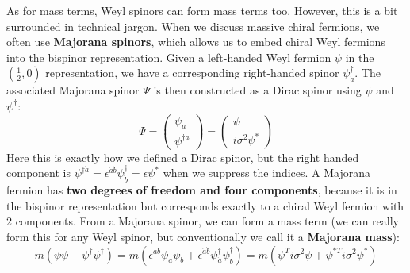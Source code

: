\documentclass[11pt, oneside]{article}   	%
\theoremstyle{definition}
\begin{document}
As for mass terms, Weyl spinors can form mass terms too. However, this is a bit surrounded in technical jargon. When we discuss massive 
chiral fermions, we often use \textbf{Majorana spinors}, which allows us to embed chiral Weyl fermions into the bispinor representation. 
Given a left-handed Weyl fermion $\psi$ in the $(\frac{1}{2}, 0)$ representation, we have a corresponding right-handed spinor 
$\psi^\dagger_{\dot a}$. The associated Majorana spinor $\Psi$ is then constructed as a Dirac spinor using $\psi$ and $\psi^\dagger$:
\begin{equation}
	\Psi = \begin{pmatrix} \psi_a \\ \psi^{\dagger\dot a} \end{pmatrix} = \begin{pmatrix} \psi \\ i\sigma^2 \psi^* \end{pmatrix}
\end{equation}
Here this is exactly how we defined a Dirac spinor, but the right handed component is $\psi^{\dagger\dot a} = \epsilon^{\dot a\dot b} \psi_{\dot b}^\dagger = \epsilon\psi^*$ when we suppress the indices. A Majorana fermion has \textbf{two degrees of freedom and four components}, 
because it is in the bispinor representation but corresponds exactly to a chiral Weyl fermion with 2 components. From a Majorana spinor, we 
can form a mass term (we can really form this for any Weyl spinor, but conventionally we call it a \textbf{Majorana mass}):
\begin{equation}
	m\left(\psi\psi + \psi^\dagger\psi^\dagger\right) = m\left(\epsilon^{ab}\psi_a\psi_b + \epsilon^{\dot a\dot b}\psi^\dagger_{\dot a}
	\psi^\dagger_{\dot b}\right) = m\left(\psi^T i\sigma^2\psi + \psi^{*T}i\sigma^2\psi^*\right)
\end{equation}
\end{document}
